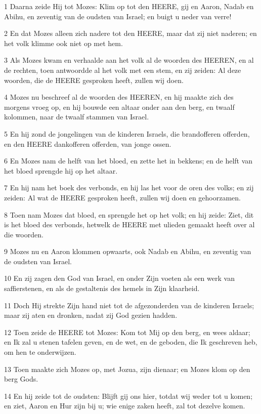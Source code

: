 \par 1 Daarna zeide Hij tot Mozes: Klim op tot den HEERE, gij en Aaron, Nadab en Abihu, en zeventig van de oudsten van Israel; en buigt u neder van verre!
\par 2 En dat Mozes alleen zich nadere tot den HEERE, maar dat zij niet naderen; en het volk klimme ook niet op met hem.
\par 3 Als Mozes kwam en verhaalde aan het volk al de woorden des HEEREN, en al de rechten, toen antwoordde al het volk met een stem, en zij zeiden: Al deze woorden, die de HEERE gesproken heeft, zullen wij doen.
\par 4 Mozes nu beschreef al de woorden des HEEREN, en hij maakte zich des morgens vroeg op, en hij bouwde een altaar onder aan den berg, en twaalf kolommen, naar de twaalf stammen van Israel.
\par 5 En hij zond de jongelingen van de kinderen Israels, die brandofferen offerden, en den HEERE dankofferen offerden, van jonge ossen.
\par 6 En Mozes nam de helft van het bloed, en zette het in bekkens; en de helft van het bloed sprengde hij op het altaar.
\par 7 En hij nam het boek des verbonds, en hij las het voor de oren des volks; en zij zeiden: Al wat de HEERE gesproken heeft, zullen wij doen en gehoorzamen.
\par 8 Toen nam Mozes dat bloed, en sprengde het op het volk; en hij zeide: Ziet, dit is het bloed des verbonds, hetwelk de HEERE met ulieden gemaakt heeft over al die woorden.
\par 9 Mozes nu en Aaron klommen opwaarts, ook Nadab en Abihu, en zeventig van de oudsten van Israel.
\par 10 En zij zagen den God van Israel, en onder Zijn voeten als een werk van saffierstenen, en als de gestaltenis des hemels in Zijn klaarheid.
\par 11 Doch Hij strekte Zijn hand niet tot de afgezonderden van de kinderen Israels; maar zij aten en dronken, nadat zij God gezien hadden.
\par 12 Toen zeide de HEERE tot Mozes: Kom tot Mij op den berg, en wees aldaar; en Ik zal u stenen tafelen geven, en de wet, en de geboden, die Ik geschreven heb, om hen te onderwijzen.
\par 13 Toen maakte zich Mozes op, met Jozua, zijn dienaar; en Mozes klom op den berg Gods.
\par 14 En hij zeide tot de oudsten: Blijft gij ons hier, totdat wij weder tot u komen; en ziet, Aaron en Hur zijn bij u; wie enige zaken heeft, zal tot dezelve komen.
